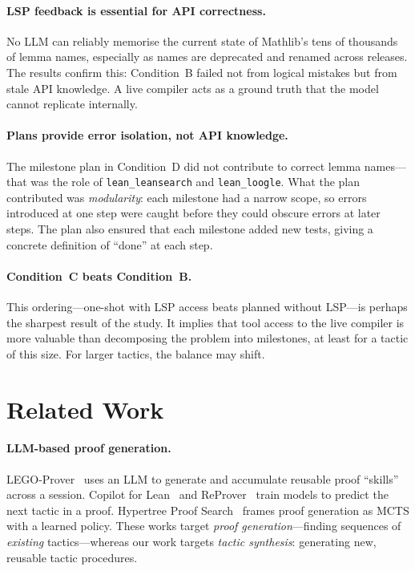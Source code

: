 \documentclass{llncs}
\begin{document}
\paragraph{LSP feedback is essential for API correctness.}
No LLM can reliably memorise the current state of Mathlib's tens of thousands
of lemma names, especially as names are deprecated and renamed across releases.
The results confirm this: Condition~B failed not from logical mistakes but from
stale API knowledge.  A live compiler acts as a ground truth that the model
cannot replicate internally.

\paragraph{Plans provide error isolation, not API knowledge.}
The milestone plan in Condition~D did not contribute to correct lemma names---
that was the role of \texttt{lean\_leansearch} and \texttt{lean\_loogle}.
What the plan contributed was \emph{modularity}: each milestone had a narrow
scope, so errors introduced at one step were caught before they could obscure
errors at later steps.  The plan also ensured that each milestone added new
tests, giving a concrete definition of ``done'' at each step.

\paragraph{Condition~C beats Condition~B.}
This ordering---one-shot with LSP access beats planned without LSP---is perhaps
the sharpest result of the study.  It implies that tool access to the live
compiler is more valuable than decomposing the problem into milestones, at
least for a tactic of this size.  For larger tactics, the balance may shift.

\section{Related Work}

\paragraph{LLM-based proof generation.}
LEGO-Prover~\cite{xia2024legoprover} uses an LLM to generate and accumulate
reusable proof ``skills'' across a session.  Copilot for Lean~\cite{han2022proof}
and ReProver~\cite{yang2024leandojo} train models to predict the next tactic
in a proof.  Hypertree Proof Search~\cite{lample2022hypertree} frames proof
generation as MCTS with a learned policy.  These works target \emph{proof
generation}---finding sequences of \emph{existing} tactics---whereas our work
targets \emph{tactic synthesis}: generating new, reusable tactic procedures.
\end{document}
